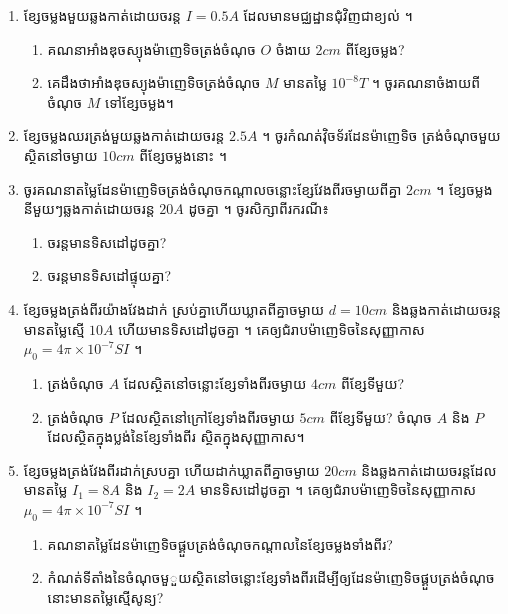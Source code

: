 \documentclass[12pt, a4paper]{article}
\begin{document}
\maketitle
\begin{enumerate}[m]
	\item ខ្សែចម្លងមួយឆ្លងកាត់ដោយចរន្ត $I=0.5A$ ដែលមានមជ្ឈដ្ឋានជុំវិញជាខ្យល់ ។
	\begin{enumerate}[k]
		\item គណនាអាំងឌុចស្យុងម៉ាញេទិចត្រង់ចំណុច $O$ ចំងាយ $2cm$ ពីខ្សែចម្លង?
		\item គេដឹងថាអាំងឌុចស្យុងម៉ាញេទិចត្រង់ចំណុច $M$ មានតម្លៃ $10^{-8} T$ ។ ចូរគណនាចំងាយពីចំណុច $M$ ទៅខ្សែចម្លង។ 
	\end{enumerate} 
	\item ខ្សែចម្លងឈរត្រង់មួយឆ្លងកាត់ដោយចរន្ត $2.5A$ ។ ចូរកំណត់វ៉ិចទ័រដែនម៉ាញេទិច ត្រង់ចំណុចមួយស្ថិតនៅចម្ងាយ $10cm$ ពីខ្សែចម្លងនោះ ។
	\item ចូរគណនាតម្លៃដែនម៉ាញេទិចត្រង់ចំណុចកណ្តាលចន្លោះខ្សែវែងពីរចម្ងាយពីគ្នា $2cm$ ។ ខ្សែចម្លងនីមួយៗឆ្លងកាត់ដោយចរន្ត $20A$ ដូចគ្នា ។ ចូរសិក្សាពីរករណី៖
	\begin{enumerate}[k]
		\item ចរន្តមានទិសដៅដូចគ្នា?
		\item ចរន្តមានទិសដៅផ្ទុយគ្នា?
	\end{enumerate}
	\item ខ្សែចម្លងត្រង់ពីរយ៉ាងវែងដាក់ ស្រប់គ្នាហើយឃ្លាតពីគ្នាចម្ងាយ $d=10cm$ និងឆ្លងកាត់ដោយចរន្តមានតម្លៃស្មើ $10A$ ហើយមានទិសដៅដូចគ្នា ។ គេឲ្យជំរាបម៉ាញេទិចនៃសុញ្ញាកាស $\mu_0=4\pi\times10^{-7}SI$ ។
	\begin{enumerate}[k]
		\item ត្រង់ចំណុច $A$ ដែលស្ថិតនៅចន្លោះខ្សែទាំងពីរចម្ងាយ $4cm$ ពីខ្សែទីមួយ?
		\item ត្រង់ចំណុច $P$ ដែលស្ថិតនៅក្រៅខ្សែទាំងពីរចម្ងាយ $5cm$ ពីខ្សែទីមួយ? ចំណុច $A$ និង $P$ ដែលស្ថិតក្នុងប្លង់នៃខ្សែទាំងពីរ ស្ថិតក្នុងសុញ្ញាកាស។
	\end{enumerate}
	\item ខ្សែចម្លងត្រង់វែងពីរដាក់ស្របគ្នា ហើយដាក់ឃ្លាតពីគ្នាចម្ងាយ $20cm$ និងឆ្លងកាត់ដោយចរន្តដែលមានតម្លៃ $I_1=8A$ និង $I_2=2A$ មានទិសដៅដូចគ្នា ។ គេឲ្យជំរាបម៉ាញេទិចនៃសុញ្ញាកាស $\mu_0=4\pi\times10^{-7}SI$ ។
	\begin{enumerate}[k]
		\item គណនាតម្លៃដែនម៉ាញេទិចផ្គួបត្រង់ចំណុចកណ្តាលនៃខ្សែចម្លងទាំងពីរ?
		\item កំណត់ទីតាំងនៃចំណុចមួួយស្ថិតនៅចន្លោះខ្សែទាំងពីរដើម្បីឲ្យដែនម៉ាញេទិចផ្គួបត្រង់ចំណុចនោះមានតម្លៃស្មើសូន្យ?
	\end{enumerate}

\end{enumerate}
\end{document}
